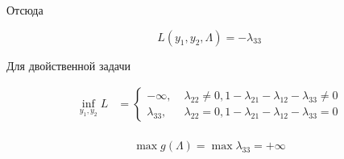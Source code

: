 	Отсюда
	
	\begin{equation}
	 L(y_1,y_2, \Lambda) = -\lambda_{33}
	\end{equation}
	
	Для двойственной задачи 

	\begin{align}
	\inf_{y_1,y_2} L &=
	\left\{
	\begin{aligned}
	-\infty ,\; & \lambda_{22} \neq 0, 1 -  \lambda_{21} - \lambda_{12} - \lambda_{33} \neq 0\\
	\lambda_{33} ,\;  &\lambda_{22} = 0, 1 -  \lambda_{21} - \lambda_{12} - \lambda_{33} = 0
	\end{aligned}
	\right. \\
	\end{align}
	
	\begin{equation}
	\max g(\Lambda) = \max \lambda_{33} = +\infty
	\end{equation}
		


